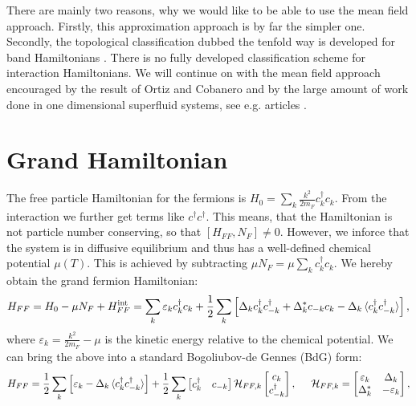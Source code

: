 There are mainly two reasons, why we would like to be able to use the mean field approach. Firstly, this approximation approach is by far the simpler one. Secondly, the topological classification dubbed the tenfold way is developed for band Hamiltonians \cite{Ryu.Topology}. There is no fully developed classification scheme for interaction Hamiltonians. We will continue on with the mean field approach encouraged by the result of Ortiz and Cobanero and by the large amount of work done in one dimensional superfluid systems, see e.g. articles \cite{Alicea, KitaevTopPhases, KitaevQuantumWires, LiYangChen, FuKane2006, GreiterIsingKitaevChain, DeGottardiMajoranaFermions, BudichTopInvMajoranaWires, ZhangWu}. 


\section{Grand Hamiltonian} \label{sec.HFFfull}
The free particle Hamiltonian for the fermions is $H_0 = \sum_k \frac{k^2}{2m_F} c^\dagger_k c_k$. From the interaction we further get terms like $c^\dagger c^\dagger$. This means, that the Hamiltonian is not particle number conserving, so that $[H_{FF}, N_F] \neq 0$. However, we inforce that the system is in diffusive equilibrium and thus has a well-defined chemical potential $\mu(T)$. This is achieved by subtracting $\mu N_F = \mu \sum_k c^\dagger_k c_k$. We hereby obtain the grand fermion Hamiltonian:
\begin{equation}
H_{FF} = H_0-\mu N_F + H^\text{int}_{FF} = \sum_k \varepsilon_k c^\dagger_k c_k + \frac{1}{2}\sum_{k} \left[ \Delta_k c^\dagger_k c^\dagger_{-k} + \Delta^*_k c_{-k} c_k  - \Delta_k \braket {c^\dagger_{k}c^\dagger_{-k}} \right], 
\label{eq.HFFdef}
\end{equation} 
where $\varepsilon_k = \frac{k^2}{2m_F} - \mu$ is the kinetic energy relative to the chemical potential. We can bring the above into a standard Bogoliubov-de Gennes (BdG) form:
\begin{equation}
H_{FF} = \frac{1}{2}\sum_k \left[\varepsilon_k - \Delta_k \braket {c^\dagger_k c^\dagger_{-k}}\right] + \frac{1}{2}\sum_{k} \begin{bmatrix} c_k^\dagger & c_{-k} \end{bmatrix} \mathcal{H}_{FF,k} \begin{bmatrix} c_k \\ c^\dagger_{-k} \end{bmatrix}, \hspace{0.5cm} \mathcal{H}_{FF,k} = \begin{bmatrix} \varepsilon_k & \Delta_k \\ \Delta^*_k & -\varepsilon_k \end{bmatrix}, 
\end{equation}

